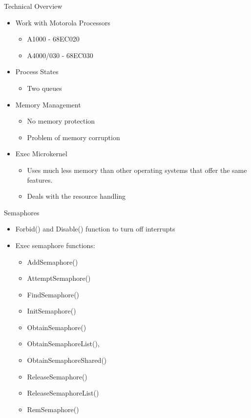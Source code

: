 \documentclass{beamer}
\begin{document}
\begin{frame}{Technical Overview}
  \begin{itemize}
  	\item Work with Motorola Processors
	\begin{itemize}
	\item A1000 - 68EC020
	\item A4000/030 - 68EC030
\end{itemize}

\item Process States 

\begin{itemize}
  	\item Two queues 
	
\end{itemize}
\item Memory Management

\begin{itemize}
  	\item No memory protection
	\item Problem of memory corruption
	
\end{itemize}
\item Exec Microkernel

\begin{itemize}
  	\item Uses much less memory than other operating systems that offer the same features.

	\item Deals with the resource handling
\end{itemize}

\end{itemize}
\end{frame}


\begin{frame}{Semaphores}
  \begin{itemize}
  	\item Forbid() and Disable() function to turn off interrupts
	\item Exec semaphore functions:
\begin{itemize}
\item AddSemaphore()
\item AttemptSemaphore()
\item FindSemaphore()
\item InitSemaphore()
\item ObtainSemaphore()
\item ObtainSemaphoreList(),
\item ObtainSemaphoreShared()
\item ReleaseSemaphore()
\item ReleaseSemaphoreList()
\item RemSemaphore()
\end{itemize}
\end{itemize}
\end{frame}
\end{document}

